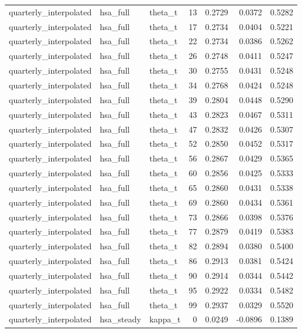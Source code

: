 \begin{tabular}{lllrrrr}
quarterly\_interpolated & hsa\_full & theta\_t & 13 & 0.2729 & 0.0372 & 0.5282 \\
quarterly\_interpolated & hsa\_full & theta\_t & 17 & 0.2734 & 0.0404 & 0.5221 \\
quarterly\_interpolated & hsa\_full & theta\_t & 22 & 0.2734 & 0.0386 & 0.5262 \\
quarterly\_interpolated & hsa\_full & theta\_t & 26 & 0.2748 & 0.0411 & 0.5247 \\
quarterly\_interpolated & hsa\_full & theta\_t & 30 & 0.2755 & 0.0431 & 0.5248 \\
quarterly\_interpolated & hsa\_full & theta\_t & 34 & 0.2768 & 0.0424 & 0.5248 \\
quarterly\_interpolated & hsa\_full & theta\_t & 39 & 0.2804 & 0.0448 & 0.5290 \\
quarterly\_interpolated & hsa\_full & theta\_t & 43 & 0.2823 & 0.0467 & 0.5311 \\
quarterly\_interpolated & hsa\_full & theta\_t & 47 & 0.2832 & 0.0426 & 0.5307 \\
quarterly\_interpolated & hsa\_full & theta\_t & 52 & 0.2850 & 0.0452 & 0.5317 \\
quarterly\_interpolated & hsa\_full & theta\_t & 56 & 0.2867 & 0.0429 & 0.5365 \\
quarterly\_interpolated & hsa\_full & theta\_t & 60 & 0.2856 & 0.0425 & 0.5333 \\
quarterly\_interpolated & hsa\_full & theta\_t & 65 & 0.2860 & 0.0431 & 0.5338 \\
quarterly\_interpolated & hsa\_full & theta\_t & 69 & 0.2860 & 0.0434 & 0.5361 \\
quarterly\_interpolated & hsa\_full & theta\_t & 73 & 0.2866 & 0.0398 & 0.5376 \\
quarterly\_interpolated & hsa\_full & theta\_t & 77 & 0.2879 & 0.0419 & 0.5383 \\
quarterly\_interpolated & hsa\_full & theta\_t & 82 & 0.2894 & 0.0380 & 0.5400 \\
quarterly\_interpolated & hsa\_full & theta\_t & 86 & 0.2913 & 0.0381 & 0.5424 \\
quarterly\_interpolated & hsa\_full & theta\_t & 90 & 0.2914 & 0.0344 & 0.5442 \\
quarterly\_interpolated & hsa\_full & theta\_t & 95 & 0.2922 & 0.0334 & 0.5482 \\
quarterly\_interpolated & hsa\_full & theta\_t & 99 & 0.2937 & 0.0329 & 0.5520 \\
quarterly\_interpolated & hsa\_steady & kappa\_t & 0 & 0.0249 & -0.0896 & 0.1389 \\

\end{tabular}
